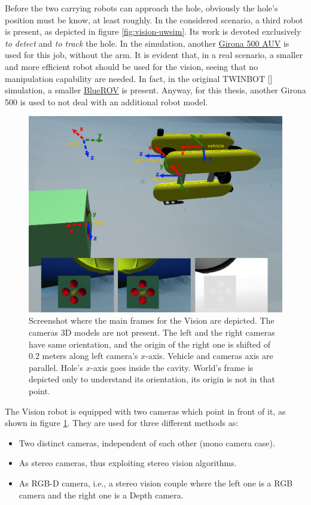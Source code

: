 Before the two carrying robots can approach the hole, obviously the hole's position must be know, at least roughly.
In the considered scenario, a third robot is present, as depicted in figure \ref{fig:vision-uwsim}. Its work is devoted exclusively \textit{to detect} and \textit{to track} the hole. In the simulation, another \href{https://cirs.udg.edu/auvs-technology/auvs/girona-500-auv/}{Girona 500 AUV} is used for this job, without the arm. It is evident that, in a real scenario, a smaller and more efficient robot should be used for the vision, seeing that no manipulation capability are needed. In fact, in the original TWINBOT [\cite{TWINBOT2019}] simulation, a smaller \href{https://bluerobotics.com/product-category/rov/bluerov2/}{BlueROV} is present.
Anyway, for this thesis, another Girona 500 is used to not deal with an additional robot model.\\

\begin{figure}[H]
	\centering
	\includegraphics[width=12.5cm]{frameVision.png}
	\caption[Main frames related to the Vision phase]{Screenshot where the main frames for the Vision are depicted. The cameras 3D models are not present. The left and the right cameras have same orientation, and the origin of the right one is shifted of 0.2 meters along left camera's $x$-axis. Vehicle and cameras axis are parallel. Hole's $x$-axis goes inside the cavity. World's frame is depicted only to understand its orientation, its origin is not in that point.}
	\label{fig:visionFrames}
\end{figure}

The Vision robot is equipped with two cameras which point in front of it, as shown in figure \ref{fig:visionFrames}. They are used for three different methods as:
\begin{itemize}
	\item Two distinct cameras, independent of each other (mono camera case).
	\item As stereo cameras, thus exploiting stereo vision algorithms.
	\item As RGB-D camera, i.e., a stereo vision couple where the left one is a RGB camera and the right one is a Depth camera.  
\end{itemize} 


